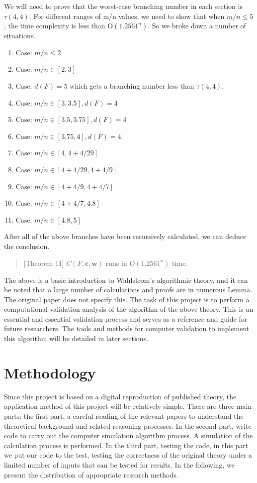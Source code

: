 \documentclass{sigchi}
\begin{document}
We will need to prove that the worst-case branching number in each section is $\tau(4,4)$. For different ranges of m/n values, we need to show that when $m/n\leqslant5$, the time complexity is less than $\mathrm{O}\left(1.2561^{n}\right)$. So we broke down a number of situations.
\begin{enumerate}
	\item Case: $m / n \leqslant2$
		\item Case: $m / n \in[2,3]$
	\item Case: $d(F)=5$ which gets a branching number less than $\tau(4,4)$.
	\item Case: $m / n \in[3,3.5], d(F)=4$
	\item Case: $m / n \in[3.5,3.75], d(F)=4$
	\item Case: $ m / n \in[3.75,4], d(F)=4 .$ 
	\item Case:  $m / n \in[4,4+4 / 29]$
	\item Case: $m / n \in[4+4 / 29,4+4 / 9]$
	\item Case: $m / n \in[4+4 / 9,4+4 / 7]$
	\item Case: $m / n \in[4+4 / 7,4.8]$
	\item Case: $m / n \in[4.8,5]$
\end{enumerate}
After all of the above branches have been recursively calculated, we can deduce the conclusion.
\begin{quote}[Theorem 11]
	$C(F, \mathbf{c}, \mathbf{w})$ runs in $\mathrm{O}\left(1.2561^{n}\right)$ time.
\end{quote}
The above is a basic introduction to Wahlstrom's algorithmic theory, and it can be noted that a large number of calculations and proofs are in numerous Lemma. The original paper does not specify this. The task of this project is to perform a computational validation analysis of the algorithm of the above theory. This is an essential and essential validation process and serves as a reference and guide for future researchers. The tools and methods for computer validation to implement this algorithm will be detailed in later sections.

\section{Methodology}
Since this project is based on a digital reproduction of published theory, the application method of this project will be relatively simple. There are three main parts: the first part, a careful reading of the relevant papers to understand the theoretical background and related reasoning processes. In the second part, write code to carry out the computer simulation algorithm process. A simulation of the calculation process is performed. In the third part, testing the code, in this part we put our code to the test, testing the correctness of the original theory under a limited number of inputs that can be tested for results. In the following, we present the distribution of appropriate research methods.
\end{document}
